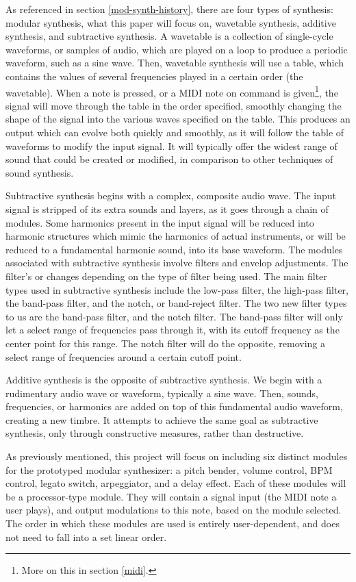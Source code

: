As referenced in section \ref{mod-synth-history}, there are four types of synthesis: modular synthesis, what this paper will focus on, wavetable synthesis, additive synthesis, and subtractive synthesis. A wavetable is a collection of single-cycle waveforms, or samples of audio, which are played on a loop to produce a periodic waveform, such as a sine wave. Then, wavetable synthesis will use a table, which contains the values of several frequencies played in a certain order (the wavetable). When a note is pressed, or a MIDI note on command is given\footnote{More on this in section \ref{midi}.}, the signal will move through the table in the order specified, smoothly changing the shape of the signal into the various waves specified on the table. This produces an output which can evolve both quickly and smoothly, as it will follow the table of waveforms to modify the input signal. It will typically offer the widest range of sound that could be created or modified, in comparison to other techniques of sound synthesis\cite{Gabrielli_2020}.

Subtractive synthesis begins with a complex, composite audio wave. The input signal is stripped of its extra sounds and layers, as it goes through a chain of modules. Some harmonics present in the input signal will be reduced into harmonic structures which mimic the harmonics of actual instruments, or will be reduced to a fundamental harmonic sound, into its base waveform\cite{Gabrielli_2020}. The modules associated with subtractive synthesis involve filters and envelop adjustments. The filter's  or  changes depending on the type of filter being used. The main filter types used in subtractive synthesis include the low-pass filter, the high-pass filter, the band-pass filter, and the notch, or band-reject filter. The two new filter types to us are the band-pass filter, and the notch filter. The band-pass filter will only let a select range of frequencies pass through it, with its cutoff frequency as the center point for this range. The notch filter will do the opposite, removing a select range of frequencies around a certain cutoff point\cite{Gabrielli_2020}.

Additive synthesis is the opposite of subtractive synthesis. We begin with a rudimentary audio wave or waveform, typically a sine wave. Then, sounds, frequencies, or harmonics are added on top of this fundamental audio waveform, creating a new timbre\cite{Winer_2018}. It attempts to achieve the same goal as subtractive synthesis, only through constructive measures, rather than destructive. 

As previously mentioned, this project will focus on including six distinct modules for the prototyped modular synthesizer: a pitch bender, volume control, BPM control, legato switch, arpeggiator, and a delay effect. Each of these modules will be a processor-type module. They will contain a signal input (the MIDI note a user plays), and output modulations to this note, based on the module selected. The order in which these modules are used is entirely user-dependent, and does not need to fall into a set linear order. 